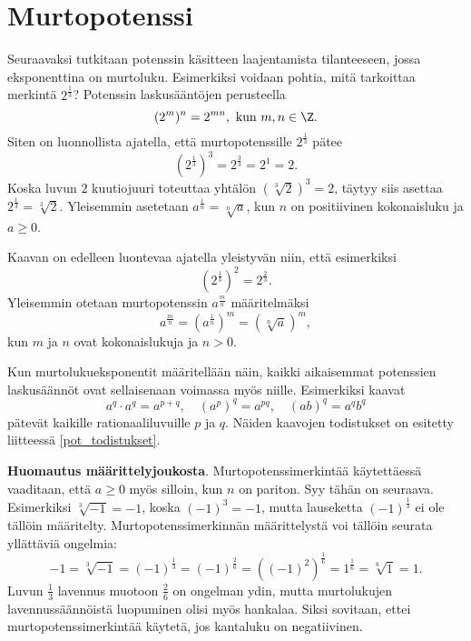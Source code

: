 \section{Murtopotenssi}

Seuraavaksi tutkitaan potenssin käsitteen laajentamista tilanteeseen, jossa eksponenttina on murtoluku.
Esimerkiksi voidaan pohtia, mitä tarkoittaa merkintä $2^\frac{1}{3}$? Potenssin laskusääntöjen perusteella
\[
(2^{m})^n = 2^{mn},\textrm{ kun }m,n\in \Z.
\]
Siten on luonnollista ajatella, että murtopotenssille $2^\frac{1}{3}$ pätee
\[
(2^\frac{1}{3})^3 = 2^\frac{3}{3} = 2^1=2.
\]
Koska luvun $2$ kuutiojuuri toteuttaa yhtälön $(\sqrt[3]{2})^3=2$, täytyy siis asettaa $2^\frac{1}{3}=\sqrt[3]{2}$. Yleisemmin asetetaan $a^\frac{1}{n} =\sqrt[n]{a}$, kun $n$ on positiivinen kokonaisluku ja $a\ge 0$.

Kaavan on edelleen luontevaa ajatella yleistyvän niin, että esimerkiksi
\[
(2^{\frac{1}{3}})^2 = 2^{\frac{2}{3}}.
\]
Yleisemmin otetaan murtopotenssin $a^\frac{m}{n}$ määritelmäksi
\[
a^\frac{m}{n} = (a^{\frac{1}{n}})^m = (\sqrt[n]{a})^m,
\]
kun $m$ ja $n$ ovat kokonaislukuja ja $n>0$. 



Kun murtolukueksponentit määritellään näin, kaikki aikaisemmat potenssien
laskusäännöt ovat sellaisenaan voimassa myös niille. Esimerkiksi kaavat
\[ a^q\cdot a^q = a^{p+q}, \quad (a^p)^q = a^{pq}, \quad (ab)^q=a^qb^q \]
pätevät kaikille rationaaliluvuille $p$ ja $q$.  Näiden kaavojen todistukset on esitetty liitteessä \ref{pot_todistukset}.

{\bf Huomautus määrittelyjoukosta}. Murtopotenssimerkintää käytettäessä vaaditaan, että $a\geq 0$ myös silloin, kun $n$ on pariton. Syy tähän on seuraava. Esimerkiksi $\sqrt[3]{-1}=-1$, koska $(-1)^3=-1$, mutta lauseketta $(-1)^\frac{1}{3}$ ei ole tällöin määritelty. Murtopotenssimerkinnän määrittelystä voi tällöin seurata yllättäviä ongelmia:
\[
 -1 = \sqrt[3]{-1} = (-1)^\frac{1}{3} = (-1)^\frac{2}{6}
= ((-1)^2)^\frac{1}{6} = 1^\frac{1}{6} = \sqrt[6]{1} = 1. 
\]
Luvun $\frac{1}{3}$ lavennus muotoon $\frac{2}{6}$ on ongelman ydin, mutta murtolukujen lavennussäännöistä luopuminen olisi myös hankalaa. Siksi sovitaan, ettei murtopotenssimerkintää käytetä, jos kantaluku on negatiivinen.

